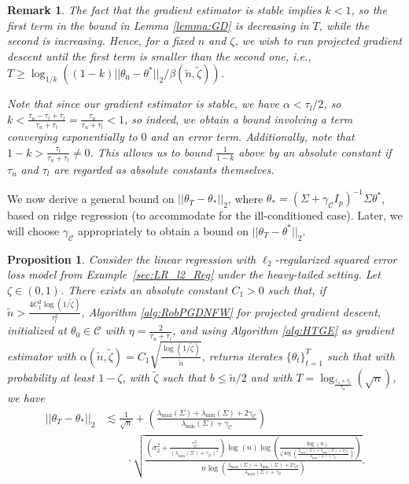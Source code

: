 \documentclass{article}
\newtheorem{prop}{Proposition}
\newtheorem{remark}{\textbf{Remark}}
\begin{document}
\begin{remark}
\label{remark:GD_Iter_LB}
The fact that the gradient estimator is stable implies $k < 1$, so the first term in the bound in Lemma \ref{lemma:GD} is decreasing in $T$, while the second is increasing. Hence, for a fixed $n$ and $\zeta$, we wish to run projected gradient descent until the first term is smaller than the second one, i.e., $T \geq \log_{1/k}\left((1 - k)||\theta_0 - \theta^*||_2/\beta(\widetilde{n}, \widetilde{\zeta})\right)$.

Note that since our gradient estimator is stable, we have $\alpha < \tau_l/2$, so $k < \frac{\tau_u - \tau_l + \tau_l}{\tau_u + \tau_l} = \frac{\tau_u}{\tau_u + \tau_l} < 1$, so indeed, we obtain a bound involving a term converging exponentially to $0$ and an error term. Additionally, note that $1 - k > \frac{\tau_l}{\tau_u + \tau_l} \neq 0$. This allows us to bound $\frac{1}{1 - k}$ above by an absolute constant if $\tau_u$ and $\tau_l$ are regarded as absolute constants themselves. 
\end{remark}

We now derive a general bound on $||\theta_T - \theta_*||_2$, where $\theta_* = (\Sigma + \gamma_{\mathcal{C}}I_p)^{-1}\Sigma\theta^*$, based on ridge regression (to accommodate for the ill-conditioned case). Later, we will choose $\gamma_{\mathcal{C}}$ appropriately to obtain a bound on $||\theta_T - \theta^*||_2$.

\begin{prop}
\label{prop:ridgeGD}
Consider the linear regression with $\ell_2$-regularized squared error loss model from Example~\ref{sec:LR_l2_Reg} under the heavy-tailed setting. Let $\zeta \in (0, 1)$. There exists an absolute constant $C_1 > 0$ such that, if $\widetilde{n} > \frac{4C_1^2\log(1/\widetilde{\zeta})}{\tau_l^2}$, Algorithm \ref{alg:RobPGDNFW} for projected gradient descent, initialized at $\theta_0 \in \mathcal{C}$ with $\eta = \frac{2}{\tau_u + \tau_l}$, and using Algorithm \ref{alg:HTGE} as gradient estimator with $\alpha(\widetilde{n}, \widetilde{\zeta}) = C_1\sqrt{\frac{\log(1/\widetilde{\zeta})}{\widetilde{n}}}$, returns iterates $\{\theta_t\}_{t = 1}^T$ such that with probability at least $1 - \zeta$, with $\widetilde{\zeta}$ such that $b \leq \widetilde{n}/2$ and with $T = \log_\frac{\tau_u + \tau_l}{\tau_u}(\sqrt{n})$, we have
\begin{align*}
||\theta_T - \theta_{*}||_2 &\lesssim \frac{1}{\sqrt{n}} + \left(\frac{\lambda_{\max}(\Sigma) + \lambda_{\min}(\Sigma) + 2\gamma_{\mathcal{C}}}{\lambda_{\min}(\Sigma) + \gamma_{\mathcal{C}}}\right)\\
& \qquad \cdot \sqrt{\frac{\left(\sigma_2^2 + \frac{\gamma_{\mathcal{C}}^2}{(\lambda_{\min}(\Sigma) + \gamma_{\mathcal{C}})^2}\right)\log(n)\log\left(\frac{\log(n)}{\zeta\log\left(\frac{\lambda_{\max}(\Sigma) + \lambda_{\min}(\Sigma) + 2\gamma_{\mathcal{C}}}{\lambda_{\max}(\Sigma) + \gamma_{\mathcal{C}}}\right)}\right)}{n\log\left(\frac{\lambda_{\max}(\Sigma) + \lambda_{\min}(\Sigma) + 2\gamma_{\mathcal{C}}}{\lambda_{\max}(\Sigma) + \gamma_{\mathcal{C}}}\right)}}.
\end{align*}
\end{prop}
\end{document}
